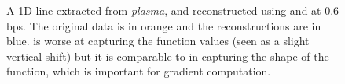 \begin{figure}[!b]
\vspace{-1.5em}
\centering
{}
\vspace{-0.5em}
\caption{A 1D line extracted from \emph{plasma}, and reconstructed using \sbit and \swav at 0.6 bps.
The original data is in orange and the reconstructions are in blue. \sbit is worse at capturing the
function values (seen as a slight vertical shift) but it is comparable to \swav in capturing the
shape of the function, which is important for gradient computation.}
\label{fig:bit-plane-vs-wavelet-norm-gradient}
\vspace{-1em}
\end{figure}

